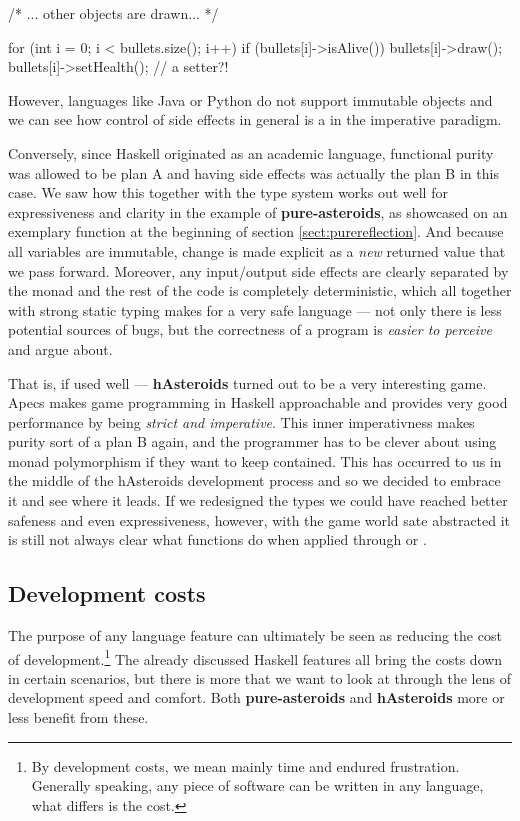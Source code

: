\documentclass[
  digital, %
  color,   %
  table,   %
  oneside, %
  lof,     %
  lot,     %
]{fithesis3}
\begin{document}
{\begin{cppblock}
{    /* ... other objects are drawn... */
    
    for (int i = 0; i < bullets.size(); i++) {
        if (bullets[i]->isAlive()) {
            bullets[i]->draw();
            bullets[i]->setHealth(); // a setter?!
        }
    }
}
\end{cppblock}
However, languages like Java or Python do not support immutable objects
and we can see how control of side effects in general is a  in the imperative paradigm.

Conversely, since Haskell originated as an academic language,
functional purity was allowed to be plan A and having
side effects was actually the plan B in this case.
We saw how this together with the type system works out well for expressiveness and clarity
in the example of \textbf{pure-asteroids}, as showcased on an exemplary function
at the beginning of section \ref{sect:purereflection}.
And because all variables are immutable, change is made explicit as a \emph{new} returned value
that we pass forward.
Moreover, any input/output side effects are clearly separated by the  monad
and the rest of the code is completely deterministic, which all together with strong static typing
makes for a very safe language --- not only there is less potential sources of bugs, but the
correctness of a program is \emph{easier to perceive} and argue about.

That is, if used well --- \textbf{hAsteroids} turned out to be a very interesting game.
Apecs makes game programming in Haskell approachable and provides
very good performance by being \emph{strict and imperative}. This inner imperativness
makes purity sort of a plan B again, and the programmer has to be clever about using monad polymorphism
if they want to keep  contained. This has occurred to us in the middle
of the hAsteroids development process and so we decided to embrace it and see where it leads.
If we redesigned the types we could have reached better safeness and even expressiveness, however,
with the game world sate abstracted it is still not always clear what functions do
when applied through  or .



\subsection{Development costs}

The purpose of any language feature can ultimately be seen as reducing the cost of development.\footnote{
By development costs, we mean mainly time and endured frustration. Generally speaking,
any piece of software can be written in any language, what differs is the cost.
}
The already discussed Haskell features all bring the costs down in certain scenarios, but there is more
that we want to look at through the lens of development speed and comfort.
Both \textbf{pure-asteroids} and \textbf{hAsteroids} more or less benefit from these.

}
\end{document}
